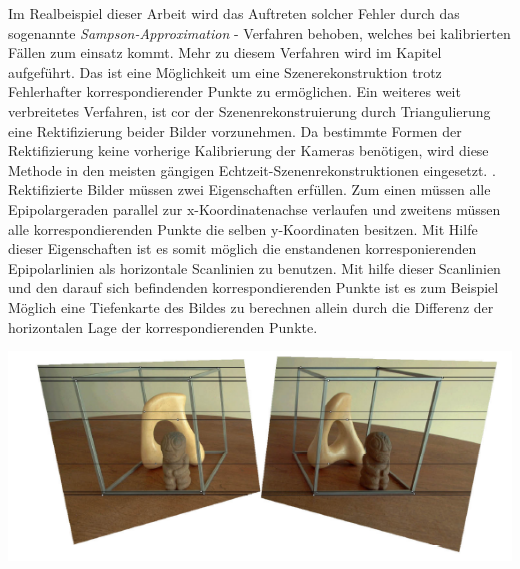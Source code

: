  Im Realbeispiel dieser Arbeit wird das Auftreten solcher Fehler durch das sogenannte \textit{Sampson-Approximation} - Verfahren behoben, welches bei kalibrierten Fällen zum einsatz kommt\cite{HZ}. Mehr zu diesem Verfahren wird im Kapitel  aufgeführt. Das ist eine Möglichkeit um eine Szenerekonstruktion trotz Fehlerhafter korrespondierender Punkte zu ermöglichen. Ein weiteres weit verbreitetes Verfahren, ist cor der Szenenrekonstruierung durch Triangulierung eine Rektifizierung beider Bilder vorzunehmen\cite{MatlabRec,ZZ,Javier,Fusiello}. Da bestimmte Formen der Rektifizierung keine vorherige Kalibrierung der Kameras benötigen, wird diese Methode in den meisten gängigen Echtzeit-Szenenrekonstruktionen eingesetzt. \cite{Fusiello,Javier,R.H.}.
 Rektifizierte Bilder müssen zwei Eigenschaften erfüllen. Zum einen müssen alle Epipolargeraden parallel zur x-Koordinatenachse verlaufen und zweitens müssen alle korrespondierenden Punkte die selben y-Koordinaten besitzen\cite{ZZ}. Mit Hilfe dieser Eigenschaften ist es somit möglich die enstandenen korresponierenden Epipolarlinien als horizontale Scanlinien zu benutzen\cite{Javier,ZZ}. Mit hilfe dieser Scanlinien und den darauf sich befindenden korrespondierenden Punkte ist es zum Beispiel Möglich eine Tiefenkarte des Bildes zu berechnen allein durch die Differenz der horizontalen Lage der korrespondierenden Punkte\cite{Javier,ZZ}. \\
 
 
 \begin{minipage}{\linewidth}
 	\centering
 	\includegraphics[width=1.\linewidth]{images/rectifiziertesBildAusZZ.png}
 \end{minipage}\\ \\

